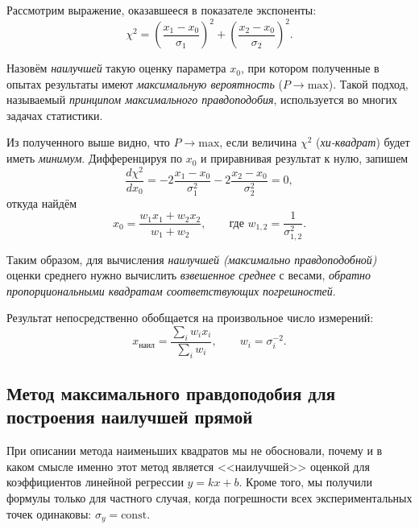 \documentclass[10pt]{article}
\begin{document}
{\small{}Рассмотрим выражение, оказавшееся в показателе экспоненты:
\[
\chi^{2}=\left(\frac{x_{1}-x_{0}}{\sigma_{1}}\right)^{2}+\left(\frac{x_{2}-x_{0}}{\sigma_{2}}\right)^{2}.
\]
}{\small\par}

{\small{}Назовём }\emph{\small{}наилучшей}{\small{} такую оценку параметра
$x_{0}$, при котором полученные в опытах результаты имеют }\emph{\small{}максимальную
вероятность}{\small{} ($P\to\mathrm{max}$). Такой подход, называемый
}\emph{\small{}принципом максимального правдоподобия}{\small{}, используется
во многих задачах статистики.}{\small\par}

{\small{}Из полученного выше видно, что $P\to\mathrm{max}$, если
величина $\chi^{2}$ (}\emph{\small{}хи-квадрат}{\small{}) будет иметь
}\emph{\small{}минимум}{\small{}. Дифференцируя по $x_{0}$ и приравнивая
результат к нулю, запишем 
\[
\frac{d\chi^{2}}{dx_{0}}=-2\frac{x_{1}-x_{0}}{\sigma_{1}^{2}}-2\frac{x_{2}-x_{0}}{\sigma_{2}^{2}}=0,
\]
откуда найдём
\begin{equation}
x_{0}=\frac{w_{1}x_{1}+w_{2}x_{2}}{w_{1}+w_{2}},\qquad\text{где }w_{1,2}=\frac{1}{\sigma_{1,2}^{2}}.
\end{equation}
}{\small\par}

{\small{}Таким образом, для вычисления}\emph{\small{} наилучшей (максимально
правдоподобной) }{\small{}оценки среднего нужно вычислить }\emph{\small{}взвешенное
среднее}{\small{} с весами, }\emph{\small{}обратно пропорциональными
квадратам соответствующих погрешностей}{\small{}.}{\small\par}

{\small{}Результат непосредственно обобщается на произвольное число
измерений:
\begin{equation}
x_{\text{наил}}=\frac{\sum\limits _{i}w_{i}x_{i}}{\sum\limits _{i}w_{i}},\qquad w_{i}=\sigma_{i}^{-2}.
\end{equation}
}{\small\par}

\subsection{{\normalsize{}Метод максимального правдоподобия для построения наилучшей
прямой\label{subsec:MMP}}}

{\small{}При описании метода наименьших квадратов мы не обосновали,
почему и в каком смысле именно этот метод является <<наилучшей>>
оценкой для коэффициентов линейной регрессии $y=kx+b$. Кроме того,
мы получили формулы только для частного случая, когда погрешности
всех экспериментальных точек одинаковы: $\sigma_{y}=\mathrm{const}$.}{\small\par}
\end{document}
